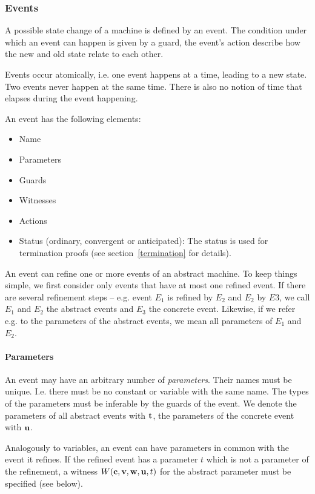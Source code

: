 \subsubsection{Events}
\label{events}
A possible state change of a machine is defined by an event.
The condition under which an event can happen is given by a guard, the event's action
describe how the new and old state relate to each other.

Events occur atomically, i.e. one event happens at a time, leading to a new state.
Two events never happen at the same time. There is also no notion of time that elapses
during the event happening.

An event has the following elements:
\begin{itemize}
\item Name
\item Parameters
\item Guards
\item Witnesses
\item Actions
\item Status (ordinary, convergent or anticipated): The status is used
  for termination proofs (see section~\ref{termination} for details).
\end{itemize}

An event can refine one or more events of an abstract machine. To keep things simple, we
  first consider only events that have at most one refined event.
If there are several refinement steps -- e.g. event $E_1$ is refined by $E_2$ and $E_2$ by
  $E3$, we call $E_1$ and $E_2$ the abstract events and $E_3$ the concrete event.
Likewise, if we refer e.g. to the parameters of the abstract events, we mean all parameters
  of $E_1$ and $E_2$.

\paragraph{Parameters}
An event may have an arbitrary number of \emph{parameters}. Their names must be unique. 
I.e. there must be no constant or variable with the same name.
The types of the parameters must be inferable by the guards of the event.
We denote the parameters of all abstract events with $\mathbf{t}$, the
parameters of the concrete event with $\mathbf{u}$.

Analogously to variables, an event can have parameters in common with the event it refines.
If the refined event has a parameter $t$ which is not a parameter of the refinement, 
a witness $W(\mathbf{c},{\mathbf{v},\mathbf{w}},\mathbf{u},t)$ for the abstract parameter must be specified (see below).

